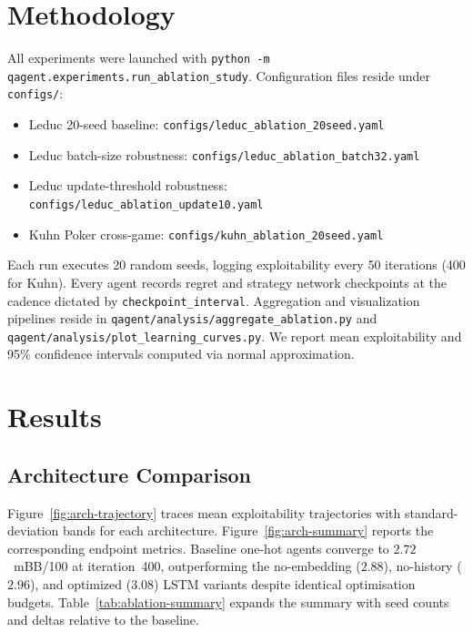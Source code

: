 \documentclass[11pt]{article}
\begin{document}
\section{Methodology}
All experiments were launched with \texttt{python -m qagent.experiments.run\_ablation\_study}. Configuration files reside under \texttt{configs/}:

\begin{itemize}
    \item Leduc 20-seed baseline: \texttt{configs/leduc\_ablation\_20seed.yaml}
    \item Leduc batch-size robustness: \texttt{configs/leduc\_ablation\_batch32.yaml}
    \item Leduc update-threshold robustness: \texttt{configs/leduc\_ablation\_update10.yaml}
    \item Kuhn Poker cross-game: \texttt{configs/kuhn\_ablation\_20seed.yaml}
\end{itemize}

Each run executes 20 random seeds, logging exploitability every 50 iterations (400 for Kuhn). Every agent records regret and strategy network checkpoints at the cadence dictated by \texttt{checkpoint\_interval}. Aggregation and visualization pipelines reside in \texttt{qagent/analysis/aggregate\_ablation.py} and \texttt{qagent/analysis/plot\_learning\_curves.py}. We report mean exploitability and 95\% confidence intervals computed via normal approximation.

\section{Results}

\subsection{Architecture Comparison}
Figure~\ref{fig:arch-trajectory} traces mean exploitability trajectories with standard-deviation bands for each architecture. Figure~\ref{fig:arch-summary} reports the corresponding endpoint metrics. Baseline one-hot agents converge to $2.72$~mBB/100 at iteration~400, outperforming the no-embedding ($2.88$), no-history ($2.96$), and optimized ($3.08$) LSTM variants despite identical optimisation budgets. Table~\ref{tab:ablation-summary} expands the summary with seed counts and deltas relative to the baseline.
\end{document}
